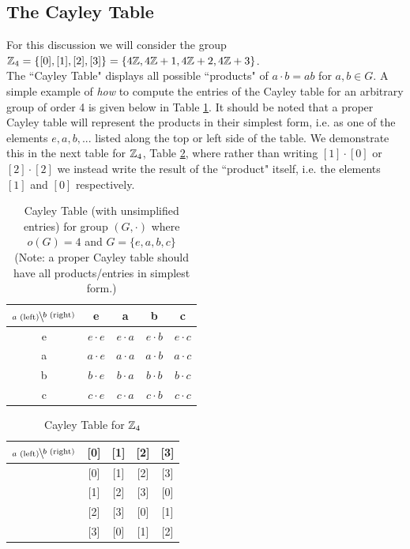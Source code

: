 \subsection{The Cayley Table}
For this discussion we will consider the group ${\mathbb{ Z}}_4=\{[0],[1],[2],[3]\}=\{4{\mathbb{ Z}},4{\mathbb{ Z}}+1,4{\mathbb{ Z}}+2,4{\mathbb{ Z}}+3\}$. \steezybreak\\
\noindent The ``Cayley Table" displays all possible ``products" of $a\cdot b=ab$ for $a,b\in G$. A simple example of \textit{how} to compute the entries of the Cayley table for an arbitrary group of order 4 is given below in Table \ref{tab:Cayley_dummy}. It should be noted that a proper Cayley table will represent the products in their simplest form, i.e. as one of the elements $e,a,b,...$ listed along the top or left side of the table. We demonstrate this in the next table for ${\mathbb{ Z}}_4$, Table \ref{tab:Cayley_Z4}, where rather than writing $[1]\cdot [0]$ or $[2]\cdot [2]$ we instead write the result of the ``product" itself, i.e. the elements $[1]$ and $[0]$ respectively.
\begin{table}[h!]
    \centering
    \begin{tabular}{c||c|c|c|c|}
         $\bsfrac{b\text{ (right)}}{a\text{ (left)}}$& e&a&b&c  \\ \hline \hline
         e&$e\cdot e$&$e\cdot a$&$e\cdot b$&$e\cdot c$  \\ \hline
         a&$a\cdot e$&$a\cdot a$&$a\cdot b$&$a\cdot c$  \\ \hline
         b&$b\cdot e$&$b\cdot a$&$b\cdot b$&$b\cdot c$  \\ \hline
         c&$c\cdot e$&$c\cdot a$&$c\cdot b$&$c\cdot c$ \\ \hline
    \end{tabular}
    \caption{Cayley Table (with unsimplified entries) for group $(G,\cdot)$ where $o(G)=4$ and $G=\{e,a,b,c\}$ \\ (Note: a proper Cayley table should have all products/entries in simplest form.)}
    \label{tab:Cayley_dummy}
\end{table}
\begin{table}[h!]
    \centering
    \begin{tabular}{c||c|c|c|c|}
         $\bsfrac{b\text{ (right)}}{a\text{ (left)}}$& [0]&[1]&[2]&[3]  \\ \hline \hline
         [0]&[0]&[1]&[2]&[3]  \\ \hline
         [1]&[1]&[2]&[3]&[0]  \\ \hline
         [2]&[2]&[3]&[0]&[1]  \\ \hline
         [3]&[3]&[0]&[1]&[2] \\ \hline
    \end{tabular}
    \caption{Cayley Table for ${\mathbb{ Z}}_4$}
    \label{tab:Cayley_Z4}
\end{table}

